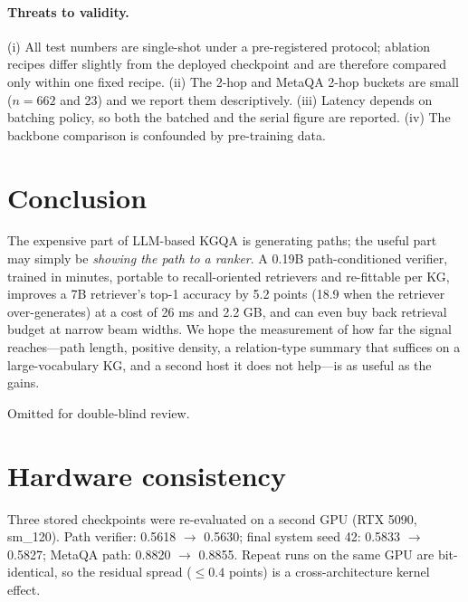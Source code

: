 \documentclass[sigconf,review,anonymous]{acmart}
\begin{document}
\paragraph{Threats to validity.}
(i) All test numbers are single-shot under a pre-registered protocol; ablation recipes differ slightly from the deployed checkpoint and are therefore compared only within one fixed recipe. (ii) The 2-hop and MetaQA 2-hop buckets are small ($n=662$ and 23) and we report them descriptively. (iii) Latency depends on batching policy, so both the batched and the serial figure are reported. (iv) The backbone comparison is confounded by pre-training data.

\section{Conclusion}
\label{sec:conclusion}

The expensive part of LLM-based KGQA is generating paths; the useful part may simply be \emph{showing the path to a ranker}. A 0.19B path-conditioned verifier, trained in minutes, portable to recall-oriented retrievers and re-fittable per KG, improves a 7B retriever's top-1 accuracy by 5.2 points (18.9 when the retriever over-generates) at a cost of 26 ms and 2.2 GB, and can even buy back retrieval budget at narrow beam widths. We hope the measurement of how far the signal reaches---path length, positive density, a relation-type summary that suffices on a large-vocabulary KG, and a second host it does not help---is as useful as the gains.

\begin{acks}
Omitted for double-blind review.
\end{acks}




\appendix

\section{Hardware consistency}
\label{app:hw}
Three stored checkpoints were re-evaluated on a second GPU (RTX 5090, sm\_120). Path verifier: 0.5618 $\rightarrow$ 0.5630; final system seed 42: 0.5833 $\rightarrow$ 0.5827; MetaQA path: 0.8820 $\rightarrow$ 0.8855. Repeat runs on the same GPU are bit-identical, so the residual spread ($\le0.4$ points) is a cross-architecture kernel effect.
\end{document}
